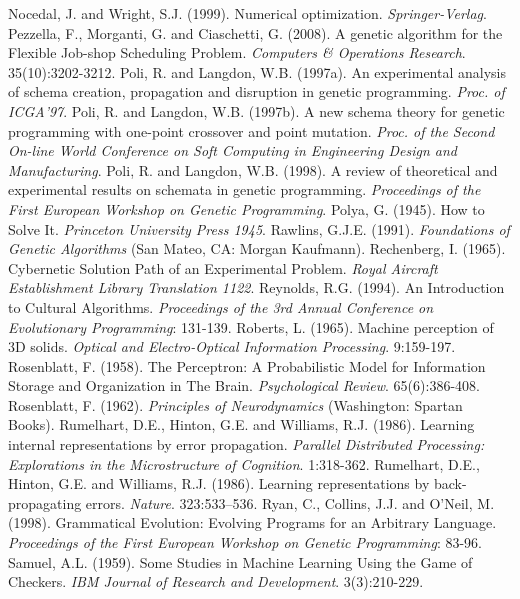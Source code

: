 \documentclass[spanish,a4paper,12pt,twoside]{report}
\begin{document}
\begin{thebibliography}{00}
   Nocedal, J. and Wright, S.J. (1999). Numerical optimization. \emph{Springer-Verlag}.
   Pezzella, F., Morganti, G. and Ciaschetti, G. (2008). A genetic algorithm for the Flexible Job-shop Scheduling Problem. \emph{Computers \& Operations Research}. 35(10):3202-3212.
   Poli, R. and Langdon, W.B. (1997a). An experimental analysis of schema creation, propagation and disruption in genetic programming. \emph{Proc. of ICGA'97}.
   Poli, R. and Langdon, W.B. (1997b). A new schema theory for genetic programming with one-point crossover and point mutation. \emph{Proc. of the Second On-line World Conference on Soft Computing in Engineering Design and Manufacturing}.
   Poli, R. and Langdon, W.B. (1998). A review of theoretical and experimental results on schemata in genetic programming. \emph{Proceedings of the First European Workshop on Genetic Programming}.
   Polya, G. (1945). How to Solve It. \emph{Princeton University Press 1945}.
   Rawlins, G.J.E. (1991). \emph{Foundations of Genetic Algorithms} (San Mateo, CA: Morgan Kaufmann).
   Rechenberg, I. (1965). Cybernetic Solution Path of an Experimental Problem. \emph{Royal Aircraft Establishment Library Translation 1122}.
   Reynolds, R.G. (1994). An Introduction to Cultural Algorithms. \emph{Proceedings of the 3rd Annual Conference on Evolutionary Programming}: 131-139.
   Roberts, L. (1965). Machine perception of 3D solids. \emph{Optical and Electro-Optical Information Processing}. 9:159-197.
   Rosenblatt, F. (1958). The Perceptron: A Probabilistic Model for Information Storage and Organization in The Brain. \emph{Psychological Review}. 65(6):386-408.
   Rosenblatt, F. (1962). \emph{Principles of Neurodynamics} (Washington: Spartan Books). 
   Rumelhart, D.E., Hinton, G.E. and Williams, R.J. (1986). Learning internal representations by error propagation. \emph{Parallel Distributed Processing: Explorations in the Microstructure of Cognition}. 1:318-362.
   Rumelhart, D.E., Hinton, G.E. and Williams, R.J. (1986). Learning representations by back-propagating errors. \emph{Nature}. 323:533–536.
   Ryan, C., Collins, J.J. and O'Neil, M. (1998). Grammatical Evolution: Evolving Programs for an Arbitrary Language. \emph{Proceedings of the First European Workshop on Genetic Programming}: 83-96.
   Samuel, A.L. (1959). Some Studies in Machine Learning Using the Game of Checkers. \emph{IBM Journal of Research and Development}. 3(3):210-229.

\end{thebibliography}
\end{document}
